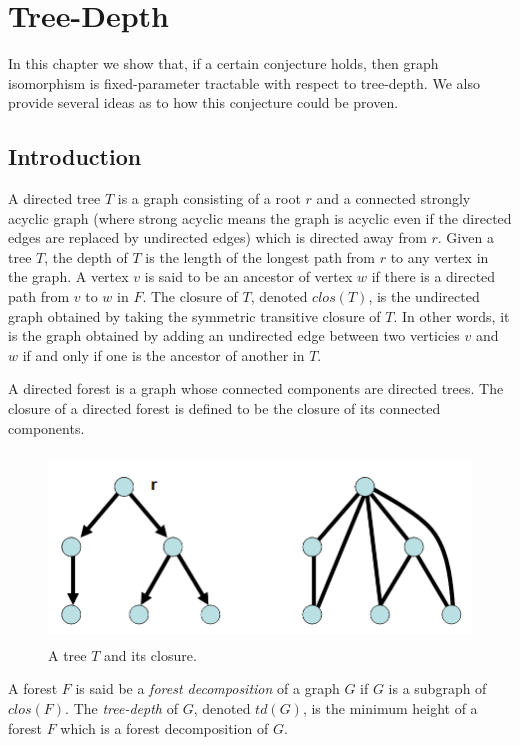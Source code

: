\documentclass[11pt]{report}
\begin{document}
\chapter{Tree-Depth}

In this chapter we show that, if a certain conjecture holds, then graph isomorphism is fixed-parameter tractable with respect to tree-depth. We also provide several ideas as to how this conjecture could be proven. 

\section{Introduction }

A directed tree $T$ is a graph consisting of a root $r$ and a connected strongly acyclic graph (where strong acyclic means the graph is acyclic even if the directed edges are replaced by undirected edges) which is directed away from $r$. Given a tree $T$, the depth of $T$ is the length of the longest path from $r$ to any  vertex in the graph. A vertex $v$ is said to be an ancestor of vertex $w$ if there is a directed path from $v$ to $w$ in $F$. The closure of $T$, denoted $clos(T)$, is the undirected graph obtained by taking the symmetric transitive closure of $T$. In other words, it is the graph obtained by adding an undirected edge between two verticies $v$ and $w$ if and only if one is the ancestor of another in $T$.

 A directed forest is a graph whose connected components are directed trees. The closure of a directed forest is defined to be the closure of its connected components.

\begin{figure}[h]
\begin{center}
\leavevmode
\includegraphics[height=50mm]{Closure_Forest_v2.png}
\end{center}
\caption{A tree $T$ and its closure.}
\end{figure}


A forest $F$ is said be a \emph{forest decomposition} of a graph $G$ if $G$ is a subgraph of $clos(F)$. The \emph{tree-depth} of $G$, denoted $td(G)$, is the minimum height of a forest $F$ which is a forest decomposition of $G$. 
\end{document}
